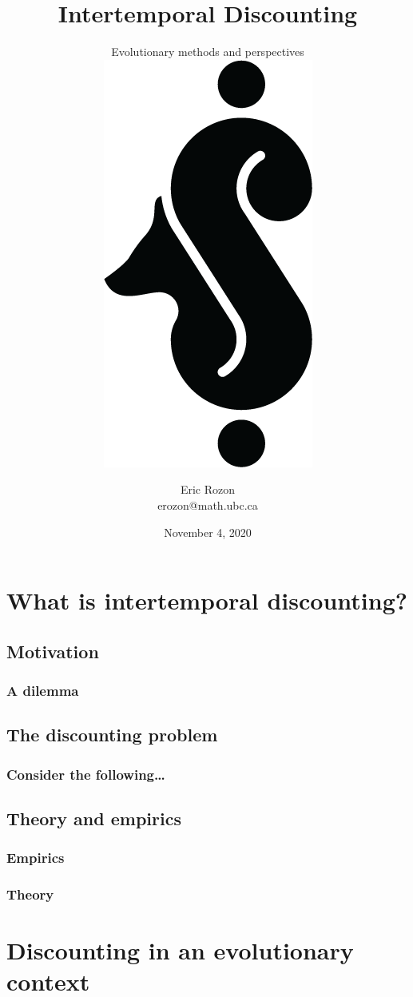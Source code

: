 \documentclass{beamer}
\title{Intertemporal Discounting}
\subtitle{Evolutionary methods and perspectives \\ \bigskip \includegraphics[scale = 0.5]{sb_logo_black.png} }
\author{Eric Rozon \\  erozon@math.ubc.ca }
\date{November 4, 2020}
\begin{document}
\begin{frame}[plain]
\titlepage
\end{frame}


\section{What is intertemporal discounting?}

\subsection{Motivation}
\begin{frame}
    \frametitle{A dilemma}
    
\end{frame}



%
%    



\subsection{The discounting problem}
\begin{frame}
    \frametitle{Consider the following\dots}
    
\end{frame}

\subsection{Theory and empirics}

\begin{frame}
    \frametitle{Empirics}
    
\end{frame}

\begin{frame}
    \frametitle{Theory}
    
\end{frame}




\section{Discounting in an evolutionary context}
\end{document}
